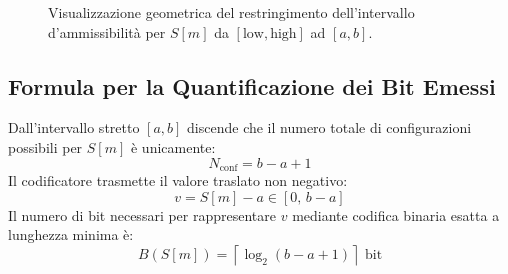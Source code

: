 \begin{figure}[H]
\centering
{}
\caption{Visualizzazione geometrica del restringimento dell'intervallo d'ammissibilit\`a per $S[m]$ da $[\text{low}, \text{high}]$ ad $[a, b]$.}
\label{fig:interpolative-tight-bounds}
\end{figure}

\FloatBarrier
\subsection{Formula per la Quantificazione dei Bit Emessi}
\label{subsec:formula-bit-emessi}

Dall'intervallo stretto $[a, b]$ discende che il numero totale di configurazioni possibili per $S[m]$ \`e unicamente:
\begin{equation}
  N_{\text{conf}} = b - a + 1
\end{equation}
Il codificatore trasmette il valore traslato non negativo:
\begin{equation}
  v = S[m] - a \in [0, \, b - a]
\end{equation}
Il numero di bit necessari per rappresentare $v$ mediante codifica binaria esatta a lunghezza minima \`e:
\begin{equation}
  \boxed{B(S[m]) = \left\lceil \log_2(b - a + 1) \right\rceil \text{ bit}}
\end{equation}

